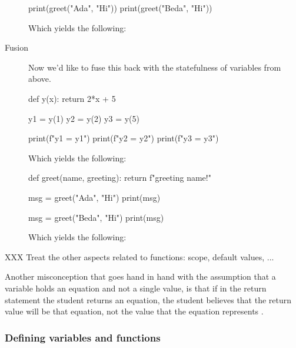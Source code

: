 \begin{description}
\begin{minipage}[t]{0.45\columnwidth}
\begin{pyblock}[funcG2]
print(greet("Ada", "Hi"))
print(greet("Beda", "Hi"))
      \end{pyblock}

      \vspace{0.5em}
      Which yields the following:
      \printpythontex[verbatim]
    \end{minipage}

  \item[Fusion] Now we'd like to fuse this back with the statefulness of 
    variables from above.

    \begin{minipage}[t]{0.45\columnwidth}
      \begin{pyblock}[funcG1]
def y(x):
  return 2*x + 5

y1 = y(1)
y2 = y(2)
y3 = y(5)

print(f"y1 = {y1}")
print(f"y2 = {y2}")
print(f"y3 = {y3}")
      \end{pyblock}

      \vspace{0.5em}
      Which yields the following:
      \printpythontex[verbatim]
    \end{minipage}
    \hfill
    \begin{minipage}[t]{0.45\columnwidth}
      \begin{pyblock}[funcG2]
def greet(name, greeting):
  return f"{greeting} {name}!"



msg = greet("Ada", "Hi")
print(msg)

msg = greet("Beda", "Hi")
print(msg)
      \end{pyblock}

      \vspace{0.5em}
      Which yields the following:
      \printpythontex[verbatim]
    \end{minipage}

\end{description}

XXX Treat the other aspects related to functions: scope, default values, ...

Another misconception that goes hand in hand with the assumption that a 
variable holds an equation and not a single value, is that if in the return 
statement the student returns an equation, the student believes that the return 
value will be that equation, not the value that the equation represents 
\parencite{Kohn2017VariableEvaluation}.


\subsubsection{Defining variables and functions}

